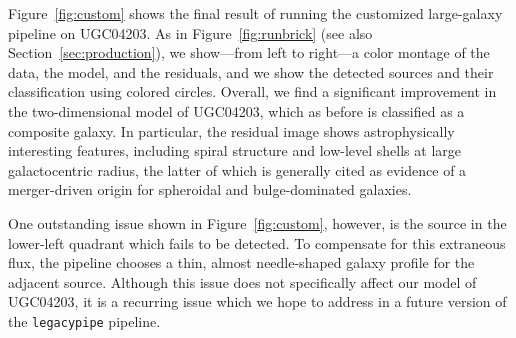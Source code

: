 Figure~\ref{fig:custom} shows the final result of running the customized
large-galaxy pipeline on UGC04203.  As in Figure~\ref{fig:runbrick} (see also
Section~\ref{sec:production}), we show---from left to right---a color montage of
the data, the model, and the residuals, and we show the detected sources and
their classification using colored circles.  Overall, we find a significant
improvement in the two-dimensional model of UGC04203, which as before is
classified as a composite galaxy.  In particular, the residual image shows
astrophysically interesting features, including spiral structure and low-level
shells at large galactocentric radius, the latter of which is generally cited as
evidence of a merger-driven origin for spheroidal and bulge-dominated galaxies. 

One outstanding issue shown in Figure~\ref{fig:custom}, however, is the source
in the lower-left quadrant which fails to be detected.  To compensate for this
extraneous flux, the pipeline chooses a thin, almost needle-shaped galaxy
profile for the adjacent source.  Although this issue does not specifically
affect our model of UGC04203, it is a recurring issue which we hope to address
in a future version of the {\tt legacypipe} pipeline.

